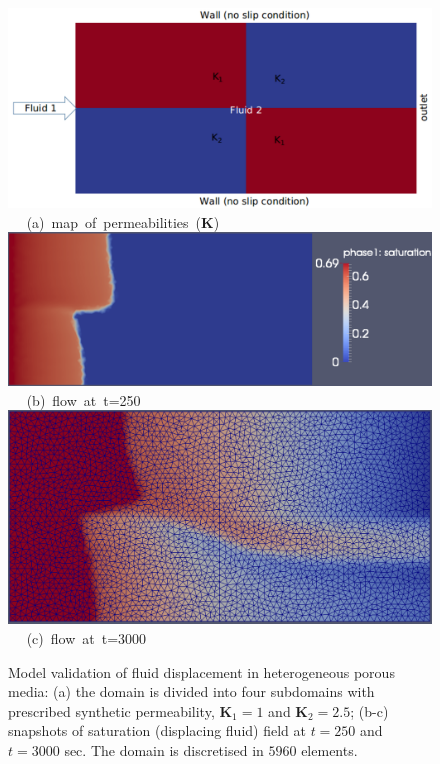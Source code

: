 \begin{figure}[ht] 
\vbox{
\hbox{\hspace{-0.3cm}
\includegraphics[width=.8\textwidth]{./Pics1/2b2_wi_fine/2b2_whole_in_fine_perm_1.pdf} 
}
\vspace{0.0cm}
\hbox{\hspace{3.5cm} (a) map of permeabilities ($\mathbf{K}$)
}
\vspace{0.25cm}
\hbox{\hspace{1.5cm}
\includegraphics[width=.9\textwidth]{./Pics1/2b2_wi_fine/2b2_whole_in_fine_250_2.pdf}
}
\vspace{0.0cm}
\hbox{\hspace{4.5cm} (b) flow at t=250  
}
\vspace{0.25cm}
\hbox{\hspace{1.5cm}
\includegraphics[width=.65\textwidth]{./Pics1/2b2_wi_fine/2b2_whole_in_fine_3000_1.pdf}
}
\vspace{0.0cm}
\hbox{\hspace{4.0cm} (c) flow at t=3000  
}
}     
\caption{Model validation of fluid displacement in heterogeneous porous media: (a) the domain is divided into four subdomains with prescribed synthetic permeability, $\mathbf{K}_{1}=1$ and $\mathbf{K}_{2}=2.5$; (b-c) snapshots of saturation (displacing fluid) field at $t=250$ and $t=3000$ sec. The domain is discretised in $5960$  elements. }
\label{fem_cv_represent_a}
\end{figure}
\clearpage



